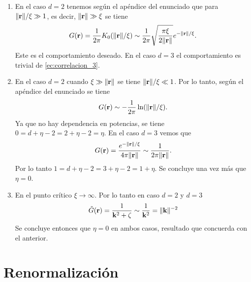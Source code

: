 \documentclass{article}
\begin{document}
\begin{enumerate}
\item En el caso $d=2$ tenemos según el apéndice del enunciado que para $\|\vb{r}\|/\xi\gg 1$, es decir, $\|\vb{r}\|\gg \xi$ se tiene
\begin{equation}
G(\vb{r})=\frac{1}{2\pi}K_0(\|\vb{r}\|/\xi)\sim\frac{1}{2\pi}\sqrt{\frac{\pi\xi}{2\|\vb{r}\|}}e^{-\|\vb{r}\|/\xi}.
\end{equation}
Este es el comportamiento deseado. En el caso $d=3$ el comportamiento es trivial de \eqref{ec:correlacion_3}.

\item En el caso $d=2$ cuando $\xi\gg\|\vb{r}\|$ se tiene $\|\vb{r}\|/\xi\ll 1$. Por lo tanto, según el apéndice del enunciado se tiene
\begin{equation}
G(\vb{r})\sim-\frac{1}{2\pi}\ln(\|\vb{r}\|/\xi).
\end{equation}
Ya que no hay dependencia en potencias, se tiene $0=d+\eta-2=2+\eta-2=\eta$. En el caso $d=3$ vemos que 
\begin{equation}
G(\vb{r})=\frac{e^{-\|\vb{r}\|/\xi}}{4\pi\|\vb{r}\|}\sim\frac{1}{2\pi\|\vb{r}\|}.
\end{equation}
Por lo tanto $1=d+\eta-2=3+\eta-2=1+\eta$. Se concluye una vez más que $\eta=0$.

\item En el punto crítico $\xi\rightarrow\infty$. Por lo tanto en caso $d=2$ y $d=3$
\begin{equation}
\tilde{G}(\vb{r})=\frac{1}{\vb{k}^2+\zeta}\sim\frac{1}{\vb{k}^2}=\|\vb{k}\|^{-2}
\end{equation}
Se concluye entonces que $\eta=0$ en ambos casos, resultado que concuerda con el anterior.

\end{enumerate}

\section{Renormalización}
\end{document}
